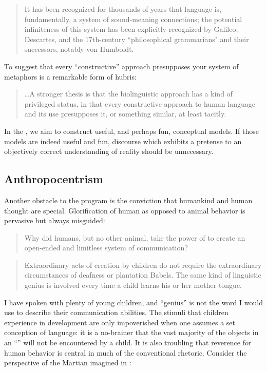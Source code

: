 \begin{quote} 
It has been recognized for thousands of years that language is, fundamentally, a system of sound-meaning connections; the potential infiniteness of this system has been explicitly recognized by Galileo, Descartes, and the 17th-century ``philosophical grammarians" and their successors, notably von Humboldt. \citep{HauserEtAl2002}
\end{quote}

To suggest that every “constructive” approach presupposes your system of metaphors is a remarkable form of hubris:

\begin{quote} 
…A stronger thesis is that the biolinguistic approach has a kind of privileged status, in that every constructive approach to human language and its use presupposes it, or something similar, at least tacitly. \citep{Chomsky2001a}
\end{quote}

  In the , we aim to construct useful, and perhaps fun, conceptual models. If those models are indeed useful and fun, discourse which exhibits a pretense to an objectively correct understanding of reality should be unnecessary.

\subsection{Anthropocentrism}

Another obstacle to the  program is the conviction that humankind and human thought are special. Glorification of human as opposed to animal behavior is pervasive but always misguided:

\begin{quote}
Why did humans, but no other animal, take the power of  to create an open-ended and limitless system of communication? \citep{HauserEtAl2002}
\end{quote}

\begin{quote} 
Extraordinary acts of creation by children do not require the extraordinary circumstances of deafness or plantation Babels. The same kind of linguistic genius is involved every time a child learns his or her mother tongue. \citep{Pinker2003}
\end{quote}

  I have spoken with plenty of young children, and “genius” is not the word I would use to describe their communication abilities. The stimuli that children experience in development are only impoverished when one assumes a set conception of language: it is a no-brainer that the vast majority of the objects in an “” will not be encountered by a child. It is also troubling that reverence for human behavior is central in much of the conventional rhetoric. Consider the perspective of the Martian imagined in \citet{HauserEtAl2002}:


